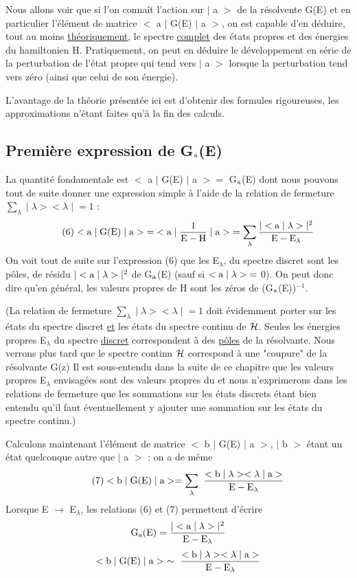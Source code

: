 Nous allons voir que si l'on connaît l'action sur $|$ a $>$ de la résolvente G(E) et en particulier l'élément de matrice $<$ a $|$ G(E) $|$ a $>$, on est capable
d'en déduire, tout au moins \ul{théoriquement}, le spectre \ul{complet} des états propres
et des énergies du hamiltonien H. Pratiquement, on peut en déduire le développement
en série de la perturbation de l'état propre qui tend vers $|$ a $>$ lorsque
la perturbation tend vers zéro (ainsi que celui de son énergie).

L'avantage de la théorie présentée ici est d'obtenir des formules
rigoureuses, les approximations n'étant faites qu'à la fin des calculs.
\subsection{Première expression de G$_{\text{a}}$(E)}%
La quantité fondamentale est $<$ a $|$ G(E) $|$ a $>=$ G$_{\text{a}}$(E) dont nous pouvons
tout de suite donner une expression simple à l'aide de la relation de fermeture
$\sum_\lambda\;|\;\lambda><\lambda\;|\;=1$ :
\[
\tag{6}<\text{a}\;|\;\text{G(E)}\;|\;\text{a}>\;=\;<\text{a}\;|\;\frac{1}{\text{E}-\text{H}}\;|\;\text{a}>\;=
\sum_\lambda\frac{|<\text{a}\;|\;\lambda>|^2}{\text{E}-\text{E}_\lambda}
\]
On voit tout de suite sur l'expression (6) que les E$_\lambda$, du spectre discret sont les
pôles, de résidu $|<\text{a}\;|\;\lambda>|^2$ de G$_{\text{a}}$(E) (sauf si $<\text{a}\;|\;\lambda>\;=$ 0). On peut donc dire
qu'en général, les valeurs propres de H sont les zéros de (G$_{\text{a}}$(E))$^{-1}$.

{\footnotesize (La relation de fermeture $\sum_\lambda\;|\;\lambda><\lambda\;|\;=1$ doit évidemment porter sur les états du
spectre discret \ul{et} les états du spectre continu de $\mathcal{H}$. Seules les énergies propres
E$_\lambda$ du spectre \ul{discret} correspondent à des \ul{pôles} de la résolvante. Nous verrons plus
tard que le spectre continu $\mathcal{H}$ correspond à une "coupure" de la résolvante G(z)
Il est sous-entendu dans la suite de ce chapitre que les valeurs propres E$_\lambda$ envisagées sont des valeurs
propres du  et nous n'exprimerons dans les relations de fermeture que les sommations sur les 
états discrets étant bien entendu
qu'il faut éventuellement y ajouter une sommation sur les états du spectre continu.)}

Calculons maintenant l'élément de matrice $<$ b $|$ G(E) $|$ a $>$, $|$ b $>$
étant un état quelconque autre que $|$ a $>$ : on a de même
\[
\tag{7}<\mt{b}\;|\;\mt{G(E)}\;|\;\mt{a}>=\sum_\lambda\ \frac{<\mt{b}\;|\;\lambda><\lambda\;|\;\mt{a}>}{\mt{E}-\mt{E}_\lambda}
\]
Lorsque E $\to$ E$_\lambda$, les relations (6) et (7) permettent d'écrire
\[
\text{G}_{\text{a}}(\text{E})=\frac{|<\text{a}\;|\;\lambda>|^2}{\text{E}-\text{E}_\lambda}
\]
\[
<\mt{b}\;|\;\mt{G(E)}\;|\;\mt{a}>\ \sim\ \frac{<\mt{b}\;|\;\lambda><\lambda\;|\;\mt{a}>}{\mt{E}-\mt{E}_\lambda}
\]

